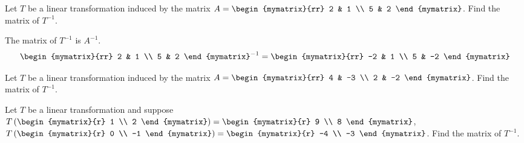 \begin{enumialphparenastyle}
\begin{ex} Let $T$ be a linear transformation induced by the matrix $A = \begin{mymatrix}{rr}
2 & 1 \\
5 & 2 
\end{mymatrix}$. Find the matrix of $T^{-1}$.
\begin{sol}
The matrix of $T^{-1}$ is $A^{-1}$.
\[
\begin{mymatrix}{rr}
2 & 1 \\
5 & 2 
\end{mymatrix} ^{-1} = 
\begin{mymatrix}{rr}
-2 & 1 \\
5 & -2
\end{mymatrix}
\]
\end{sol}
\end{ex}

\begin{ex} Let $T$ be a linear transformation induced by the matrix $A = \begin{mymatrix}{rr}
4 & -3 \\
2 & -2 
\end{mymatrix}$. Find the matrix of $T^{-1}$. 
\end{ex}

\begin{ex} Let $T$ be a linear transformation and suppose $T \left( \begin{mymatrix}{r}
1 \\
2
\end{mymatrix} \right) = \begin{mymatrix}{r}
9 \\
8
\end{mymatrix}$, $T \left( \begin{mymatrix}{r}
0 \\
-1
\end{mymatrix} \right) = \begin{mymatrix}{r}
-4 \\
-3
\end{mymatrix}$. 
Find the matrix of $T^{-1}$. 
\end{ex}

\end{enumialphparenastyle}